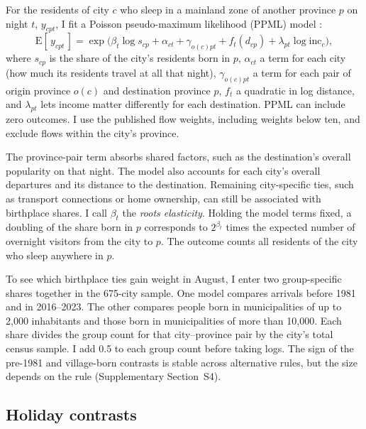 \documentclass[pdflatex,sn-mathphys-num,referee]{sn-jnl}
\begin{document}
For the residents of city $c$ who sleep in a mainland zone of another province $p$ on night $t$, $y_{cpt}$, I fit a Poisson pseudo-maximum likelihood (PPML) model \cite{santossilva2006log,correia2020fast,weidner2021bias}:
\begin{equation}
\mathrm{E}[\,y_{cpt}\,] = \exp\!\big(\beta_t \log s_{cp} + \alpha_{ct} + \gamma_{o(c)pt} + f_t(d_{cp}) + \lambda_{pt}\log \mathrm{inc}_c\big),
\label{eq:ppml}
\end{equation}
where $s_{cp}$ is the share of the city's residents born in $p$, $\alpha_{ct}$ a term for each city (how much its residents travel at all that night), $\gamma_{o(c)pt}$ a term for each pair of origin province $o(c)$ and destination province $p$, $f_t$ a quadratic in log distance, and $\lambda_{pt}$ lets income matter differently for each destination. PPML can include zero outcomes. I use the published flow weights, including weights below ten, and exclude flows within the city's province.

The province-pair term absorbs shared factors, such as the destination's overall popularity on that night. The model also accounts for each city's overall departures and its distance to the destination. Remaining city-specific ties, such as transport connections or home ownership, can still be associated with birthplace shares. I call $\beta_t$ the \emph{roots elasticity}. Holding the model terms fixed, a doubling of the share born in $p$ corresponds to $2^{\beta_t}$ times the expected number of overnight visitors from the city to $p$. The outcome counts all residents of the city who sleep anywhere in $p$.

To see which birthplace ties gain weight in August, I enter two group-specific shares together in the 675-city sample. One model compares arrivals before 1981 and in 2016--2023. The other compares people born in municipalities of up to 2,000 inhabitants and those born in municipalities of more than 10,000. Each share divides the group count for that city--province pair by the city's total census sample. I add 0.5 to each group count before taking logs. The sign of the pre-1981 and village-born contrasts is stable across alternative rules, but the size depends on the rule (Supplementary Section~S4).

\subsection{Holiday contrasts}
\end{document}
